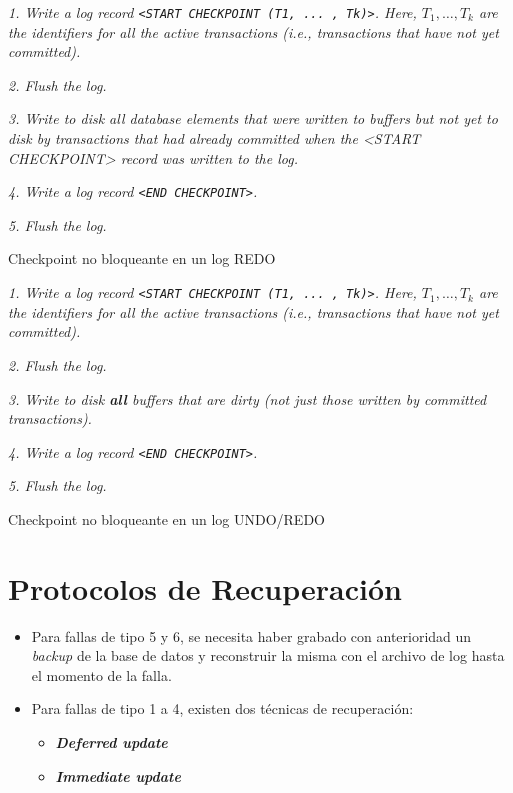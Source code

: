 \documentclass[a4paper, twoside]{article}
\begin{document}
\begin{algorithm}[H]
	\emph{1. Write a log record \texttt{<START CHECKPOINT (T1, ... , Tk)>}. Here, $T_{1}, \ldots, T_{k}$ are the identifiers for all the active transactions (i.e., transactions that have not yet committed).}

	\emph{2. Flush the log.}

	\emph{3. Write to disk all database elements that were written to buffers but not yet to disk by transactions that had already committed when the <START CHECKPOINT> record was written to the log.}

	\emph{4. Write a log record \texttt{<END CHECKPOINT>}.}

	\emph{5. Flush the log.}
	\caption{Checkpoint no bloqueante en un log REDO}
\end{algorithm}

\begin{algorithm}[H]
	\emph{1. Write a log record \texttt{<START CHECKPOINT (T1, ... , Tk)>}. Here, $T_{1}, \ldots, T_{k}$ are the identifiers for all the active transactions (i.e., transactions that have not yet committed).}

	\emph{2. Flush the log.}

	\emph{3. Write to disk \textbf{all} buffers that are dirty (not just those written by committed transactions).}

	\emph{4. Write a log record \texttt{<END CHECKPOINT>}.}

	\emph{5. Flush the log.}
	\caption{Checkpoint no bloqueante en un log UNDO/REDO}
\end{algorithm}

\section{Protocolos de Recuperación}
\begin{itemize}
	\item Para fallas de tipo 5 y 6, se necesita haber grabado con anterioridad un \emph{backup} de la base de datos y reconstruir la misma con el archivo de log hasta el momento de la falla.
	\item Para fallas de tipo 1 a 4, existen dos técnicas de recuperación:
	\begin{itemize}
		\item \textbf{\emph{Deferred update}}
		\item \textbf{\emph{Immediate update}}
	\end{itemize}
\end{itemize}
\end{document}
